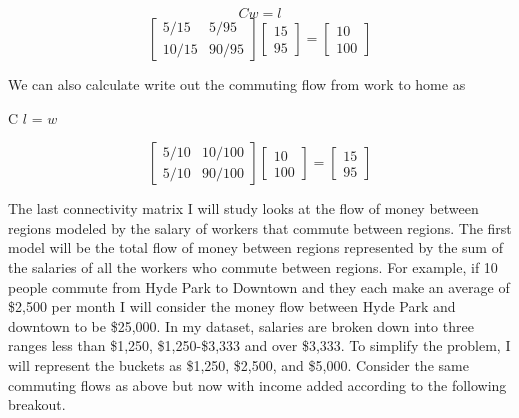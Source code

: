\documentclass{article}
\theoremstyle{definition}
\theoremstyle{remark}
\begin{document}
\begin{equation}C w = l\end{equation}
\begin{equation} 
  \begin{bmatrix}
    5/15 & 5/95\\
    10/15 & 90/95
  \end{bmatrix}
  \begin{bmatrix}
    15\\
    95
  \end{bmatrix}
  = 
  \begin{bmatrix}
    10\\
    100
  \end{bmatrix}
\end{equation}

We can also calculate write out the commuting flow from work to home as

\begin{center}C $l$ = $w$\end{center}
\begin{equation} 
  \begin{bmatrix}
    5/10 & 10/100\\
    5/10 & 90/100
  \end{bmatrix}
  \begin{bmatrix}
    10\\
    100
  \end{bmatrix}
  = 
  \begin{bmatrix}
    15\\
    95
  \end{bmatrix}
\end{equation}

The last connectivity matrix I will study looks at the flow of money between regions modeled by the salary of workers that commute between regions.  The first model will be the total flow of money between regions represented by the sum of the salaries of all the workers who commute between regions.  For example, if 10 people commute from Hyde Park to Downtown and they each make an average of \$2,500 per month I will consider the money flow between Hyde Park and downtown to be \$25,000.  In my dataset, salaries are broken down into three ranges less than \$1,250, \$1,250-\$3,333 and over \$3,333.  To simplify the problem, I will represent the buckets as \$1,250, \$2,500, and \$5,000.  Consider the same commuting flows as above but now with income added according to the following breakout.\\
\end{document}
